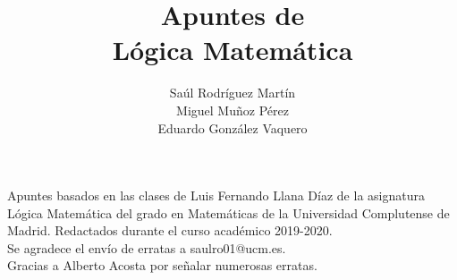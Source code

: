 \documentclass{report}
\theoremstyle{definition}
\theoremstyle{remark}
\theoremstyle{jeje}
\numberwithin{section}{chapter}
\numberwithin{equation}{chapter}
\begin{document}
\title{Apuntes de\\ Lógica Matemática}


\author{Saúl Rodríguez Martín\\ Miguel Muñoz Pérez \\ Eduardo González Vaquero}

\maketitle




\cleardoublepage
\vspace*{13.5pc}
\begin{center}
  Apuntes basados en las clases de Luis Fernando Llana Díaz de la asignatura Lógica Matemática del grado en Matemáticas de la Universidad Complutense de Madrid. Redactados durante el curso académico 2019-2020.\\
  Se agradece el envío de erratas a saulro01@ucm.es.\\
  Gracias a Alberto Acosta por señalar numerosas erratas.
\end{center}
\cleardoublepage


\tableofcontents
{}









\appendix



\printindex
\end{document}
